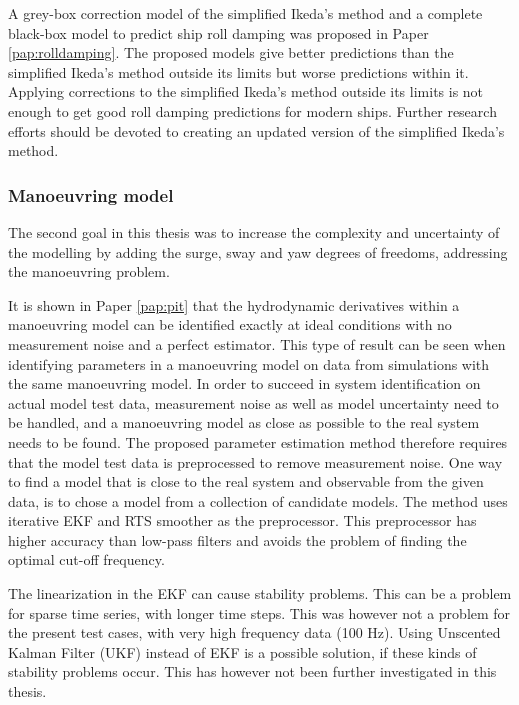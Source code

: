 A grey-box correction model of the simplified Ikeda's method and a complete black-box model to predict ship roll damping was proposed in Paper \ref{pap:rolldamping}. The proposed models give better predictions than the simplified Ikeda's method outside its limits but worse predictions within it. Applying corrections to the simplified Ikeda's method outside its limits is not enough to get good roll damping predictions for modern ships. Further
research efforts should be devoted to creating an updated version of the simplified Ikeda's method.

\subsubsection*{Manoeuvring model}
The second goal in this thesis was to increase the complexity and uncertainty of the modelling by adding the surge, sway and yaw degrees of freedoms, addressing the manoeuvring problem.

It is shown in Paper \ref{pap:pit} that the hydrodynamic derivatives within a manoeuvring model can be identified exactly at ideal conditions with no measurement noise and a perfect estimator. 
This type of result can be seen when identifying parameters in a manoeuvring model on data from simulations with the same manoeuvring model.
In order to succeed in system identification on actual model test data, measurement noise as well as model uncertainty need to be handled, and a manoeuvring model as close as possible to the real system needs to be found. The proposed parameter estimation method therefore requires that the model test data is preprocessed to remove measurement noise. One way to find a model that is close to the real system and observable from the given data, is to chose a model from a collection of candidate models. The method uses iterative EKF and RTS smoother as the preprocessor. This preprocessor has higher accuracy than low-pass filters and avoids the problem of finding the optimal cut-off frequency. 

The linearization in the EKF can cause stability problems. This can be a problem for sparse time series, with longer time steps. This was however not a problem for the present test cases, with very high frequency data (100 Hz). 
Using Unscented Kalman Filter (UKF) instead of EKF is a possible solution, if these kinds of stability problems occur. This has however not been further investigated in this thesis.

